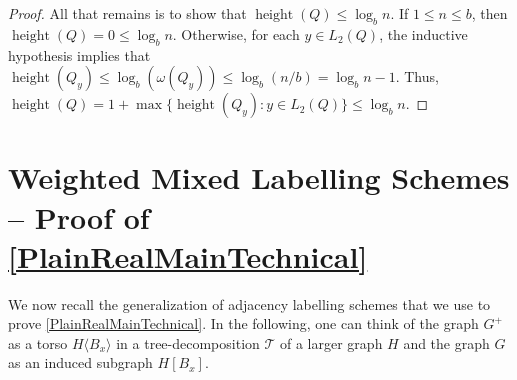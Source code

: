 \documentclass{patmorin}
\renewcommand{\le}{\leqslant}
\newcommand{\torso}[2]{{#1}\langle{#2}\rangle}
\DeclareMathOperator{\height}{height}
\newcommand{\calQ}{\mathcal{Q}}
\newcommand{\calT}{\mathcal{T}}
\begin{document}
\begin{proof}


    All that remains is to show that $\height(Q)\le\log_b n$.  If $1\le n \le b$, then $\height(Q)=0\le\log_b n$.  Otherwise, for each $y\in L_2(Q)$, the inductive hypothesis implies that $\height(Q_y)\le\log_b(\omega(Q_y))\le\log_b(n/b)=\log_b n - 1$.  Thus, $\height(Q)=1+\max\{\height(Q_y):y\in L_2(Q)\}\le \log_b n$.
  \end{proof}



  \section{Weighted Mixed Labelling Schemes -- Proof of \cref{PlainRealMainTechnical}}
  \label{weighted_mixed_section}

We now recall the generalization of adjacency labelling schemes that we use to prove \cref{PlainRealMainTechnical}.  In the following, one can think of the graph $G^+$ as a torso $\torso{H}{B_x}$ in a tree-decomposition $\calT$ of a larger graph $H$ and the graph $G$ as an induced subgraph $H[B_x]$.
\end{document}
